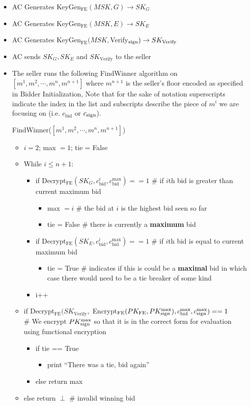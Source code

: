 \documentclass[12pt,twoside]{reedthesis}
\begin{document}
       \begin{itemize}
       \item AC Generates KeyGen$_\text{FE}(MSK,G) \to SK_G$
       \item AC Generates KeyGen$_\text{FE}(MSK,E) \to SK_E$
       \item AC Generates KeyGen$_\text{FE}(MSK,$Verify$_\text{sign}) \to SK_\text{Verify}$
       \item AC sends $SK_G, SK_E$ and $SK_\text{Verify}$ to the seller
       \item The seller runs the following FindWinner algorithm on  $[m^1,m^2, \cdots , m^n, m^{n+1}]$ where $m^{n+1}$ is the seller's floor encoded as specified in Bidder Initialization, Note that for the sake of notation superscripts indicate the index in the list and subscripts describe the piece of $m^i$ we are focusing on (i.e. $c_\text{bid}$ or $c_\text{sign}$).
       \par FindWinner($[m^1,m^2,\cdots,m^n,m^{n+1}]$) 
       	\begin{itemize}
	\item $i = 2$; max $= 1$; tie = False
	\item While $i\leq n+1$:
		\begin{itemize}
		\item if Decrypt$_\text{FE}(SK_G,c_\text{bid}^i,
		c_\text{bid}^\text{max}) == 1$ \# if $i$th bid is greater than current maximum bid
			\begin{itemize}
			\item max $= i$ \# the bid at $i$ is the highest bid seen so far
			\item tie = False \# there is currently a \textbf{maximum} bid
			\end{itemize}
		\item if Decrypt$_\text{FE}(SK_E,c_\text{bid}^i,
		c_\text{bid}^\text{max}) == 1$ \# if $i$th bid is equal to current maximum bid
			\begin{itemize}
			\item tie = True \# indicates if this is could be a \textbf{maximal} bid in which case there would need to be a tie breaker of some kind
			\end{itemize}
		\item i++
		\end{itemize}
	\item if Decrypt$_\text{FE}(SK_\text{Verify},$ Encrypt$_\text{FE}(PK_\text{FE},PK_\text{sign}^\text{max}), c_\text{bid}^\text{max},c_\text{sign}^\text{max}) == 1$ \\ \# We encrypt $PK_\text{sign}^\text{max}$ so that it is in the correct form for evaluation using functional encryption
		\begin{itemize}
		\item if tie == True
			\begin{itemize}
			\item print ``There was a tie, bid again''
			\end{itemize}
		\item else return max
		\end{itemize}
	\item else return $\perp$ \# invalid winning bid
	\end{itemize}
	

\end{itemize}
\end{document}
